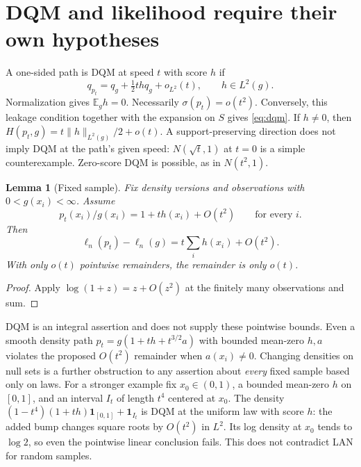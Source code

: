 \documentclass[11pt]{article}
\newcommand{\E}{\mathbb E}
\newtheorem{lemma}{Lemma}
\theoremstyle{definition}
\theoremstyle{remark}
\begin{document}
\section{DQM and likelihood require their own hypotheses}
A one-sided path is DQM at speed $t$ with score $h$ if
\begin{equation}\label{eq:dqm}
 q_{p_t}=q_g+\tfrac12t hq_g+o_{L^2}(t),\qquad h\in L^2(g).
\end{equation}
Normalization gives $\E_g h=0$. Necessarily $\sigma(p_t)=o(t^2)$.
Conversely, this leakage condition together with the expansion on $S$ gives
\eqref{eq:dqm}. If $h\ne0$, then
$H(p_t,g)=t\|h\|_{L^2(g)}/2+o(t)$. A support-preserving direction does not
imply DQM at the path's given speed: $N(\sqrt t,1)$ at $t=0$ is a simple
counterexample. Zero-score DQM is possible, as in $N(t^2,1)$.

\begin{lemma}[Fixed sample]\label{lem:fixed}
Fix density versions and observations with $0<g(x_i)<\infty$. Assume
\[
 p_t(x_i)/g(x_i)=1+t h(x_i)+O(t^2)\qquad\text{for every }i.
\]
Then
\[
 \ell_n(p_t)-\ell_n(g)=t\sum_i h(x_i)+O(t^2).
\]
With only $o(t)$ pointwise remainders, the remainder is only $o(t)$.
\end{lemma}
\begin{proof}
Apply $\log(1+z)=z+O(z^2)$ at the finitely many observations and sum.
\end{proof}
DQM is an integral assertion and does not supply these pointwise bounds.
Even a smooth density path $p_t=g(1+t h+t^{3/2}a)$ with bounded mean-zero
$h,a$ violates the proposed $O(t^2)$ remainder when $a(x_i)\ne0$.
Changing densities on null sets is a further obstruction to any assertion
about \emph{every} fixed sample based only on laws.
For a stronger example fix $x_0\in(0,1)$, a bounded mean-zero $h$ on
$[0,1]$, and an interval $I_t$ of length $t^4$ centered at $x_0$. The density
$(1-t^4)(1+th)\mathbf1_{[0,1]}+\mathbf1_{I_t}$ is DQM at the uniform law
with score $h$: the added bump changes square roots by $O(t^2)$ in $L^2$.
Its log density at $x_0$ tends to $\log2$, so even the pointwise linear
conclusion fails. This does not contradict LAN for random samples.
\end{document}
